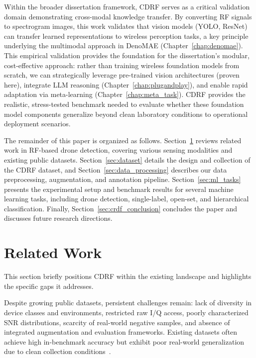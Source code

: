 Within the broader dissertation framework, CDRF serves as a critical validation domain demonstrating cross-modal knowledge transfer. By converting RF signals to spectrogram images, this work validates that vision models (YOLO, ResNet) can transfer learned representations to wireless perception tasks, a key principle underlying the multimodal approach in DenoMAE (Chapter~\ref{chap:denomae}). This empirical validation provides the foundation for the dissertation's modular, cost-effective approach: rather than training wireless foundation models from scratch, we can strategically leverage pre-trained vision architectures (proven here), integrate LLM reasoning (Chapter~\ref{chap:plugandplay}), and enable rapid adaptation via meta-learning (Chapter~\ref{chap:meta_task}). CDRF provides the realistic, stress-tested benchmark needed to evaluate whether these foundation model components generalize beyond clean laboratory conditions to operational deployment scenarios.

The remainder of this paper is organized as follows. Section~\ref{sec:related_work} reviews related work in RF-based drone detection, covering various sensing modalities and existing public datasets. Section~\ref{sec:dataset} details the design and collection of the CDRF dataset, and Section~\ref{sec:data_processing} describes our data preprocessing, augmentation, and annotation pipeline. Section~\ref{sec:ml_tasks} presents the experimental setup and benchmark results for several machine learning tasks, including drone detection, single-label, open-set, and hierarchical classification. Finally, Section~\ref{sec:crdf_conclusion} concludes the paper and discusses future research directions.

\section{Related Work}
\label{sec:related_work}

This section briefly positions CDRF within the existing landscape and highlights the specific gaps it addresses.

Despite growing public datasets, persistent challenges remain: lack of diversity in device classes and environments, restricted raw I/Q access, poorly characterized SNR distributions, scarcity of real-world negative samples, and absence of integrated augmentation and evaluation frameworks. Existing datasets often achieve high in-benchmark accuracy but exhibit poor real-world generalization due to clean collection conditions~\cite{elyousseph2024robustness, gluge2024robust}.

